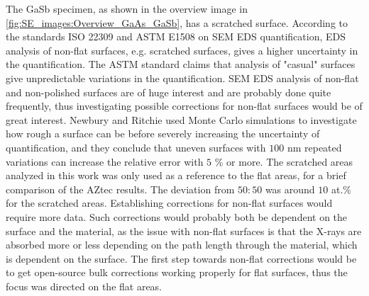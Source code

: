 


The GaSb specimen, as shown in the overview image in \cref{fig:SE_images:Overview_GaAs_GaSb}, has a scratched surface.
According to the standards ISO 22309 \cite{iso_quantification_22309} and ASTM E1508 \cite{astm_e1508_eds_quantification} on SEM EDS quantification, EDS analysis of non-flat surfaces, e.g. scratched surfaces, gives a higher uncertainty in the quantification.
The ASTM standard claims that analysis of "casual" surfaces give unpredictable variations in the quantification.
SEM EDS analysis of non-flat and non-polished surfaces are of huge interest and are probably done quite frequently, thus investigating possible corrections for non-flat surfaces would be of great interest.
Newbury and Ritchie \cite{newbury_ritchie_2013_flatness} used Monte Carlo simulations to investigate how rough a surface can be before severely increasing the uncertainty of quantification, and they conclude that uneven surfaces with $100$ nm repeated variations can increase the relative error with $5$ \% or more.
The scratched areas analyzed in this work was only used as a reference to the flat areas, for a brief comparison of the AZtec results.
The deviation from $50:50$ was around $10$ at.\% for the scratched areas.
Establishing corrections for non-flat surfaces would require more data.
Such corrections would probably both be dependent on the surface and the material, as the issue with non-flat surfaces is that the X-rays are absorbed more or less depending on the path length through the material, which is dependent on the surface.
The first step towards non-flat corrections would be to get open-source bulk corrections working properly for flat surfaces, thus the focus was directed on the flat areas.









